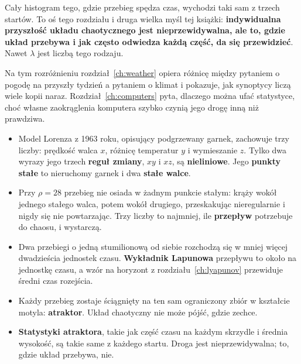 
\noindent
Cały histogram tego, gdzie przebieg spędza czas, wychodzi taki sam z trzech
startów. To oś tego rozdziału i druga wielka myśl tej książki:
\textbf{indywidualna przyszłość układu chaotycznego jest nieprzewidywalna,
ale to, gdzie układ przebywa i jak często odwiedza każdą część, da się
przewidzieć}. Nawet $\lambda$ jest liczbą tego rodzaju.

Na tym rozróżnieniu rozdział~\ref{ch:weather} opiera różnicę między pytaniem
o pogodę na przyszły tydzień a pytaniem o klimat i pokazuje, jak synoptycy
liczą wiele kopii naraz. Rozdział~\ref{ch:computers} pyta, dlaczego można
ufać statystyce, choć własne zaokrąglenia komputera szybko czynią jego drogę
inną niż prawdziwa.

\begin{summarybox}
\begin{itemize}
\item Model Lorenza z 1963 roku, opisujący podgrzewany garnek, zachowuje trzy
  liczby: prędkość walca $x$, różnicę temperatur $y$ i wymieszanie $z$. Tylko
  dwa wyrazy jego trzech \textbf{reguł zmiany}, $xy$ i $xz$, są
  \textbf{nieliniowe}. Jego \textbf{punkty stałe} to nieruchomy garnek i dwa
  \textbf{stałe walce}.
\item Przy $\rho = 28$ przebieg nie osiada w żadnym punkcie stałym: krąży
  wokół jednego stałego walca, potem wokół drugiego, przeskakując
  nieregularnie i nigdy się nie powtarzając. Trzy liczby to najmniej, ile
  \textbf{przepływ} potrzebuje do chaosu, i wystarczą.
\item Dwa przebiegi o jedną stumilionową od siebie rozchodzą się w mniej
  więcej dwadzieścia jednostek czasu. \textbf{Wykładnik Lapunowa} przepływu
  to około  na jednostkę czasu, a wzór na horyzont z
  rozdziału~\ref{ch:lyapunov} przewiduje średni czas rozejścia.
\item Każdy przebieg zostaje ściągnięty na ten sam ograniczony zbiór w
  kształcie motyla: \textbf{atraktor}. Układ chaotyczny nie może pójść, gdzie
  zechce.
\item \textbf{Statystyki atraktora}, takie jak część czasu na każdym
  skrzydle i średnia wysokość, są takie same z każdego startu. Droga jest
  nieprzewidywalna; to, gdzie układ przebywa, nie.
\end{itemize}
\end{summarybox}

